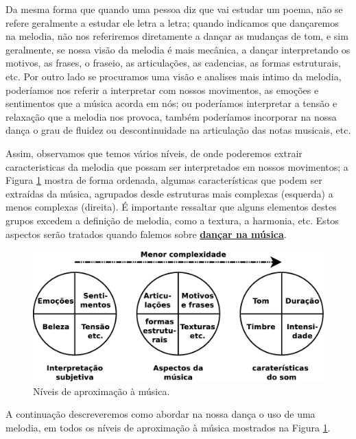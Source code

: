 Da mesma forma que quando uma pessoa diz que vai estudar um poema, 
não se refere geralmente a estudar ele letra a letra;
quando indicamos que dançaremos na melodia,
não nos referiremos diretamente a dançar as mudanças de tom, 
e sim geralmente, se nossa visão da melodia é mais mecânica, a dançar interpretando os motivos, as frases,
o fraseio, as articulações, as cadencias, as formas estruturais, etc.
Por outro lado se procuramos uma visão e analises mais intimo da melodia,
poderíamos nos referir a interpretar com nossos movimentos, as emoções e sentimentos que a música acorda em nós;
ou poderíamos interpretar a tensão e relaxação que a melodia nos provoca,
também poderíamos incorporar na nossa dança o grau de fluidez ou descontinuidade na articulação das notas musicais, etc.

Assim, observamos que temos vários níveis, 
de onde poderemos extrair caracteristicas da melodia que possam ser interpretados em nossos movimentos;
a Figura \ref{fig:etapa-melodica-1} mostra de forma ordenada,
algumas características que podem ser extraídas da música, 
agrupados desde estruturas mais complexas (esquerda) a menos complexas (direita).
É importante ressaltar que alguns elementos destes grupos excedem a definição de melodia, como a textura, a harmonia, etc.
Estos aspectos serão tratados quando falemos sobre \hyperref[subsec:dancamusica]{\textbf{dançar na música}}.

\begin{figure}[!h]
    \centering
    \includegraphics[width=\textwidth]{chapters/cap-musicalidade-tecnica/etapa-melodica-1.eps}
    \caption{Níveis de aproximação à música.}
    \label{fig:etapa-melodica-1}
\end{figure}

A continuação descreveremos como abordar na nossa dança o uso de uma melodia,
em todos os níveis de aproximação à música mostrados na Figura \ref{fig:etapa-melodica-1}.

